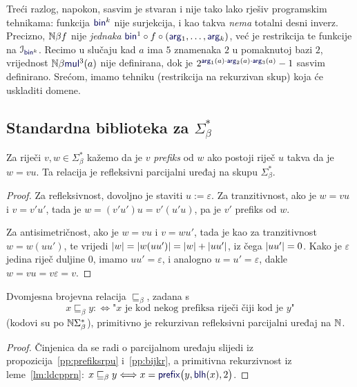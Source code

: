 Treći razlog, napokon, sasvim je stvaran i nije tako lako rješiv programskim tehnikama: funkcija $\f{bin}^k$ nije surjekcija, i kao takva \emph{nema} totalni desni inverz. Precizno, ${\mathbb N}\beta f$ nije \emph{jednaka} $\f{bin}^1\circ f\circ(\f{arg}_1,\dotsc,\f{arg}_k)$, već je restrikcija te funkcije na $\im{\f{bin}^k}$. %
Recimo u slučaju kad $a$ ima $5$ znamenaka $2$ u pomaknutoj bazi $2$, vrijednost $\N\beta\f{mul}^3(a)$ nije definirana, dok je $2^{\f{arg}_1(a)\cdot\f{arg}_2(a)\cdot\f{arg}_3(a)}-1$ sasvim definirano. Srećom, imamo tehniku (restrikcija na rekurzivan skup) koja će uskladiti domene.

\subsection{Standardna biblioteka za \texorpdfstring{$\Sigma_\beta^*$}{binarne stringove}}\label{sec:stdstring}

\begin{propozicija}\label{pp:prefiksrpu}
Za riječi $v,w\in\Sigma_\beta^*$ kažemo da je $v$ \emph{prefiks} od $w$ ako postoji riječ $u$ takva da je $w=vu$.
Ta relacija je refleksivni parcijalni uređaj na skupu $\Sigma_\beta^*$.
\end{propozicija}
\begin{proof}
Za refleksivnost, dovoljno je staviti $u:=\varepsilon$. Za tranzitivnost, ako je $w=vu$ i $v=v'u'$, tada je $w=(v'u')u=v'(u'u)$, pa je $v'$ prefiks od $w$.

Za antisimetričnost, ako je $w=vu$ i $v=wu'$, tada je kao za tranzitivnost $w=w(uu')$, te vrijedi $\lvert w\rvert=\lvert w(uu')\rvert=\lvert w\rvert+\lvert uu'\rvert$, iz čega $\lvert uu'\rvert=0$. Kako je $\varepsilon$ jedina riječ duljine $0$, imamo $uu'=\varepsilon$, i analogno $u=u'=\varepsilon$, dakle $w=vu=v\varepsilon=v$.
\end{proof}

\begin{korolar}\label{kor:preceqprnrpu}
Dvomjesna brojevna relacija $\sqsubseteq_\beta$, zadana s
\begin{equation}
    x\sqsubseteq_\beta y:\Longleftrightarrow\text{"$x$ je kod nekog prefiksa riječi čiji kod je $y$"}
\end{equation}
(kodovi su po ${\mathbb N}\Sigma_\beta^*$), primitivno je rekurzivan refleksivni parcijalni uređaj na ${\mathbb N}$.
\end{korolar}
\begin{proof}
Činjenica da se radi o parcijalnom uređaju slijedi iz propozicija~\ref{pp:prefiksrpu} i~\ref{pp:bijkr}, a
primitivna rekurzivnost iz leme~\ref{lm:ldcpprn}: $x\sqsubseteq_\beta y\Longleftrightarrow x=\f{prefix}\bigl(y,\f{blh}(x),2\bigr)$.
\end{proof}

